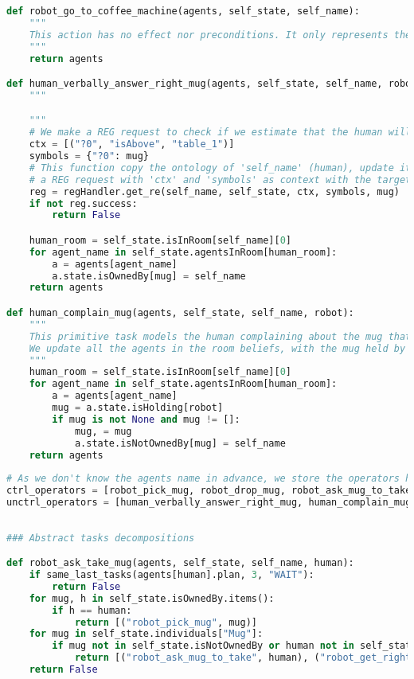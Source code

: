 \begin{lstlisting}[language=Python]
def robot_go_to_coffee_machine(agents, self_state, self_name):
    """
    This action has no effect nor preconditions. It only represents the robot leaving the room (for the example)
    """
    return agents

def human_verbally_answer_right_mug(agents, self_state, self_name, robot, mug):
    """

    """
    # We make a REG request to check if we estimate that the human will be able to refer to their mug
    ctx = [("?0", "isAbove", "table_1")]
    symbols = {"?0": mug}
    # This function copy the ontology of 'self_name' (human), update it with beliefs from 'self_state' and runs
    # a REG request with 'ctx' and 'symbols' as context with the target entity 'mug'
    reg = regHandler.get_re(self_name, self_state, ctx, symbols, mug)
    if not reg.success:
        return False

    human_room = self_state.isInRoom[self_name][0]
    for agent_name in self_state.agentsInRoom[human_room]:
        a = agents[agent_name]
        a.state.isOwnedBy[mug] = self_name
    return agents

def human_complain_mug(agents, self_state, self_name, robot):
    """
    This primitive task models the human complaining about the mug that the robot is 'holding' not being theirs. 
    We update all the agents in the room beliefs, with the mug held by the 'robot' not being the one 'self_name' (human)
    """
    human_room = self_state.isInRoom[self_name][0]
    for agent_name in self_state.agentsInRoom[human_room]:
        a = agents[agent_name]
        mug = a.state.isHolding[robot]
        if mug is not None and mug != []:
            mug, = mug
            a.state.isNotOwnedBy[mug] = self_name
    return agents
    
# As we don't know the agents name in advance, we store the operators here, until a plan request
ctrl_operators = [robot_pick_mug, robot_drop_mug, robot_ask_mug_to_take, robot_go_to_coffee_machine]
unctrl_operators = [human_verbally_answer_right_mug, human_complain_mug]
    
    
### Abstract tasks decompositions

def robot_ask_take_mug(agents, self_state, self_name, human):
    if same_last_tasks(agents[human].plan, 3, "WAIT"):
        return False
    for mug, h in self_state.isOwnedBy.items():
        if h == human:
            return [("robot_pick_mug", mug)]
    for mug in self_state.individuals["Mug"]:
        if mug not in self_state.isNotOwnedBy or human not in self_state.isNotOwnedBy[mug]:
            return [("robot_ask_mug_to_take", human), ("robot_get_right_mug", human)]
    return False


\end{lstlisting}
